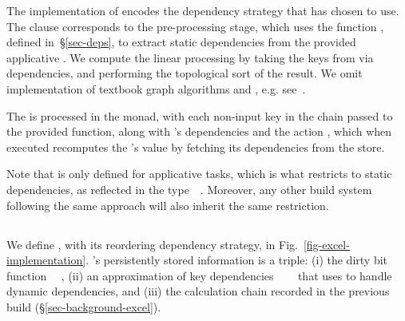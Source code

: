 The implementation of  encodes the dependency strategy that
\Make has chosen to use. The  clause corresponds to the pre-processing
stage, which uses the function , defined in~\S\ref{sec-deps},
to extract static dependencies from the provided applicative . We
compute the linear processing  by taking the keys 
from  via dependencies, and performing the topological sort of the
result. We omit implementation of textbook graph algorithms
 and , e.g.
see~\cite{cormen2001introduction}.

The  is processed in the  monad, with each non-input key
 in the chain passed to the provided  function, along with
's dependencies and the action , which when executed recomputes
the 's value by fetching its dependencies from the store.

Note that  is only defined for applicative tasks, which is what
restricts \Make to static dependencies, as reflected in the
type~~. Moreover, any other build system following
the same  approach will also inherit the same restriction.

\subsection{\Excel}\label{sec-implementation-excel}

We define \Excel, with its reordering dependency strategy, in  Fig.~\ref{fig-excel-implementation}.
\Excel's persistently stored information is a triple: (i) the dirty bit
function ~\hs{->}~, (ii) an approximation of key dependencies
~\hs{->}~~ that \Excel uses to handle
dynamic dependencies, and (iii) the calculation chain \hs{[@@k]} recorded in the
previous build (\S\ref{sec-background-excel}).

